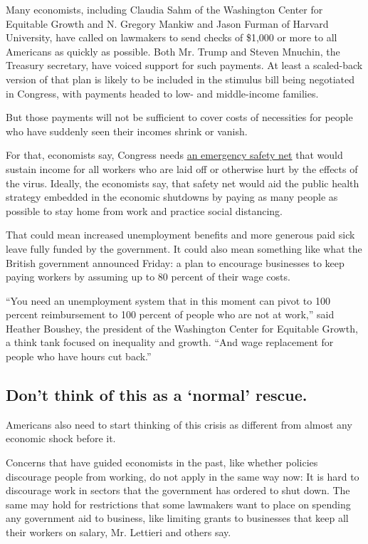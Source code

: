 Many economists, including Claudia Sahm of the Washington Center for
Equitable Growth and N. Gregory Mankiw and Jason Furman of Harvard
University, have called on lawmakers to send checks of \$1,000 or more
to all Americans as quickly as possible. Both Mr. Trump and Steven
Mnuchin, the Treasury secretary, have voiced support for such payments.
At least a scaled-back version of that plan is likely to be included in
the stimulus bill being negotiated in Congress, with payments headed to
low- and middle-income families.

But those payments will not be sufficient to cover costs of necessities
for people who have suddenly seen their incomes shrink or vanish.

For that, economists say, Congress needs
\href{https://www.nytimes3xbfgragh.onion/2020/03/17/us/politics/congress-coronavirus-economy.html}{an
emergency safety net} that would sustain income for all workers who are
laid off or otherwise hurt by the effects of the virus. Ideally, the
economists say, that safety net would aid the public health strategy
embedded in the economic shutdowns by paying as many people as possible
to stay home from work and practice social distancing.

That could mean increased unemployment benefits and more generous paid
sick leave fully funded by the government. It could also mean something
like what the British government announced Friday: a plan to encourage
businesses to keep paying workers by assuming up to 80 percent of their
wage costs.

``You need an unemployment system that in this moment can pivot to 100
percent reimbursement to 100 percent of people who are not at work,''
said Heather Boushey, the president of the Washington Center for
Equitable Growth, a think tank focused on inequality and growth. ``And
wage replacement for people who have hours cut back.''

\hypertarget{dont-think-of-this-as-a-normal-rescue}{%
\subsection{Don't think of this as a `normal'
rescue.}\label{dont-think-of-this-as-a-normal-rescue}}

Americans also need to start thinking of this crisis as different from
almost any economic shock before it.

Concerns that have guided economists in the past, like whether policies
discourage people from working, do not apply in the same way now: It is
hard to discourage work in sectors that the government has ordered to
shut down. The same may hold for restrictions that some lawmakers want
to place on spending any government aid to business, like limiting
grants to businesses that keep all their workers on salary, Mr. Lettieri
and others say.

